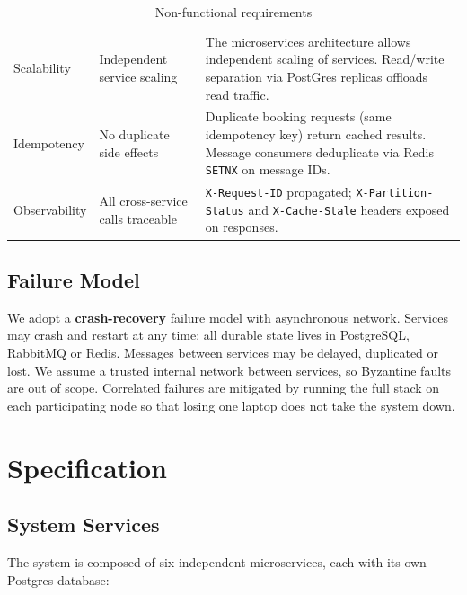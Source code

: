 \documentclass[12pt,a4paper]{article}
\begin{document}
\begin{table}[H]
\begin{tabularx}{\textwidth}{L{3.2cm} L{4.4cm} X}
  Scalability & Independent service scaling & The microservices architecture allows independent scaling of services. Read/write separation via PostGres replicas offloads read traffic. \\\addlinespace[0.1cm]
  Idempotency & No duplicate side effects & Duplicate booking requests (same idempotency key) return cached results. Message consumers deduplicate via Redis \texttt{SETNX} on message IDs. \\\addlinespace[0.1cm]
  Observability & All cross-service calls traceable & \texttt{X-Request-ID}
        propagated; \texttt{X-Partition-Status} and
        \texttt{X-Cache-Stale} headers exposed on responses. \\
  \bottomrule
\end{tabularx}
\caption{Non-functional requirements}
\label{tab:nfr}
\end{table}

\subsection{Failure Model}

We adopt a \textbf{crash-recovery} failure model with asynchronous network. Services may crash and restart at any time; all durable state lives in PostgreSQL, RabbitMQ or Redis. Messages between services may be delayed, duplicated or lost. We assume a trusted internal network between services, so Byzantine faults are out of scope. Correlated failures are mitigated by running the full stack on each participating node so that losing one laptop does not take the system down.

\section{Specification}
\label{sec:specification}
 
\subsection{System Services}
 
The system is composed of six independent microservices, each with its own Postgres database:
 
\end{document}

